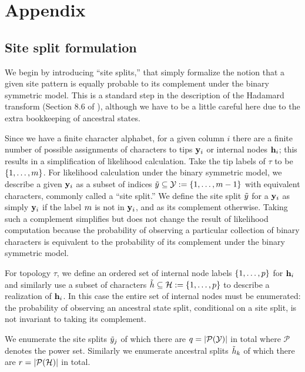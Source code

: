 \section*{Appendix}

\subsection*{Site split formulation}
We begin by introducing ``site splits,'' that simply formalize the notion that a given site pattern is equally probable to its complement under the binary symmetric model.
This is a standard step in the description of the Hadamard transform (Section 8.6 of \cite{Semple2003-em}), although we have to be a little careful here due to the extra bookkeeping of ancestral states.

Since we have a finite character alphabet, for a given column $i$ there are a finite number of possible assignments of characters to tips $\mathbf{y}_i$ or internal nodes $\mathbf{h}_i$; this results in a simplification of likelihood calculation.
Take the tip labels of $\tau$ to be $\{1,\ldots,m\}$.
For likelihood calculation under the binary symmetric model, we describe a given $\mathbf{y}_i$ as a subset of indices $\tilde{y}\subseteq\mathcal{Y}:=\{1,\ldots,m-1\}$ with equivalent characters, commonly called a ``site split.''
We define the site split $\tilde{y}$ for a $\mathbf{y}_i$ as simply $\mathbf{y}_i$ if the label $m$ is not in $\mathbf{y}_i$, and as its complement otherwise.
Taking such a complement simplifies but does not change the result of likelihood computation because the probability of observing a particular collection of binary characters is equivalent to the probability of its complement under the binary symmetric model.

For topology $\tau$, we define an ordered set of internal node labels $\{1,\ldots,p\}$ for $\mathbf{h}_i$ and similarly use a subset of characters $\tilde{h}\subseteq\mathcal{H}:=\{1,\ldots,p\}$ to describe a realization of $\mathbf{h}_i$.
In this case the entire set of internal nodes must be enumerated: the probability of observing an ancestral state split, conditional on a site split, is not invariant to taking its complement.

We enumerate the site splits $\tilde{y}_j$ of which there are $q=|\mathcal{P}(\mathcal{Y})|$ in total where $\mathcal{P}$ denotes the power set.
Similarly we enumerate ancestral splits $\tilde{h}_k$ of which there are $r=|\mathcal{P}(\mathcal{H})|$ in total.


